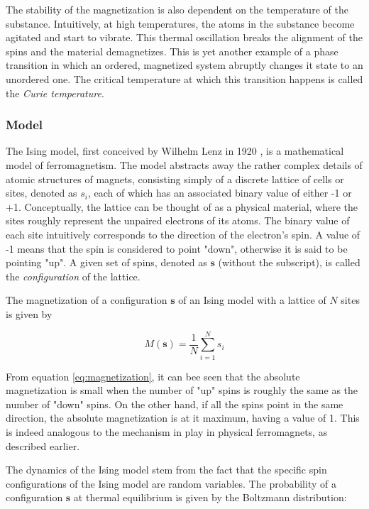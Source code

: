 \documentclass[12pt]{article}
\begin{document}
The stability of the magnetization is also dependent on the temperature of the substance. Intuitively, at high temperatures, the atoms in the substance become agitated and start to vibrate. This thermal oscillation breaks the alignment of the spins and the material demagnetizes. This is yet another example of a phase transition in which an ordered, magnetized system abruptly changes it state to an unordered one. The critical temperature at which this transition happens is called the \textit{Curie temperature}.

\subsubsection{Model} 

The Ising model, first conceived by Wilhelm Lenz in 1920 \cite{ising-history}, is a mathematical model of ferromagnetism. The model abstracts away the rather complex details of atomic structures of magnets, consisting simply of a discrete lattice of cells or sites, denoted as $s_i$, each of which has an associated binary value of either -1 or +1. Conceptually, the lattice can be thought of as a physical material, where the sites roughly represent the unpaired electrons of its atoms. The binary value of each site intuitively corresponds to the direction of the electron's spin. A value of -1 means that the spin is considered to point "down", otherwise it is said to be pointing "up". A given set of spins, denoted as $\boldsymbol{s}$ (without the subscript), is called the \textit{configuration} of the lattice. \cite{statistical-mechanics}

The magnetization of a configuration $\boldsymbol{s}$ of an Ising model with a lattice of $N$ sites is given by 

\begin{equation}
M(\boldsymbol{s}) = \frac{1}{N} \sum_{i=1}^N s_i
\label{eq:magnetization}
\end{equation}

From equation \ref{eq:magnetization}, it can bee seen that the absolute magnetization is small when the number of "up" spins is roughly the same as the number of "down" spins. On the other hand, if all the spins point in the same direction, the absolute magnetization is at it maximum, having a value of 1. This is indeed analogous to the mechanism in play in physical ferromagnets, as described earlier. 

The dynamics of the Ising model stem from the fact that the specific spin configurations of the Ising model are random variables. The probability of a configuration $\boldsymbol{s}$ at thermal equilibrium is given by the Boltzmann distribution: 
\end{document}

